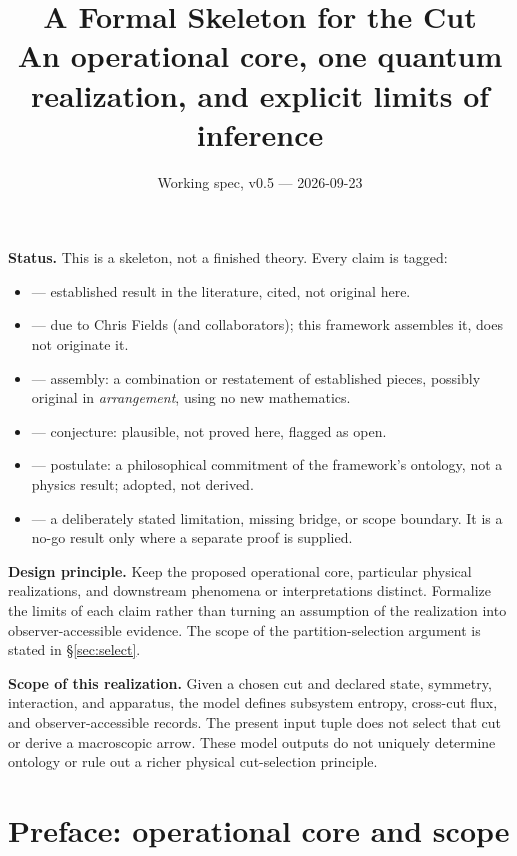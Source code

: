 \documentclass[11pt]{article}
\title{\textbf{A Formal Skeleton for the Cut}\\[4pt]
\large An operational core, one quantum realization, and explicit limits of inference}
\author{}
\date{Working spec, v0.5 --- 2026-09-23}
\newcommand{\est}{\textcolor{teal!70!black}{\textsf{\small[EST]}}}
\newcommand{\fields}{\textcolor{violet}{\textsf{\small[FIELDS]}}}
\newcommand{\asm}{\textcolor{blue!70!black}{\textsf{\small[ASM]}}}
\newcommand{\conj}{\textcolor{orange!80!black}{\textsf{\small[CONJ]}}}
\newcommand{\post}{\textcolor{purple!70!black}{\textsf{\small[POST]}}}
\newcommand{\gap}{\textcolor{red!75!black}{\textsf{\small[GAP]}}}
\def\est{[EST]}\def\fields{[FIELDS]}\def\asm{[ASM]}%
\def\conj{[CONJ]}\def\post{[POST]}\def\gap{[GAP]}%
\theoremstyle{definition}
\theoremstyle{remark}
\begin{document}
\maketitle

\begin{principlebox}
\noindent\textbf{Status.} This is a skeleton, not a finished theory. Every claim is tagged:
\begin{itemize}[leftmargin=1.4em, itemsep=1pt, topsep=3pt]
  \item \est{} --- established result in the literature, cited, not original here.
  \item \fields{} --- due to Chris Fields (and collaborators); this framework assembles it, does not originate it.
  \item \asm{} --- assembly: a combination or restatement of established pieces, possibly original in \emph{arrangement}, using no new mathematics.
  \item \conj{} --- conjecture: plausible, not proved here, flagged as open.
  \item \post{} --- postulate: a philosophical commitment of the framework's ontology, not a physics result; adopted, not derived.
  \item \gap{} --- a deliberately stated limitation, missing bridge, or scope boundary. It is a no-go result only where a separate proof is supplied.
\end{itemize}
\vspace{2pt}
\noindent\textbf{Design principle.} Keep the proposed operational core, particular physical realizations, and downstream phenomena or interpretations distinct. Formalize the limits of each claim rather than turning an assumption of the realization into observer-accessible evidence. The scope of the partition-selection argument is stated in \S\ref{sec:select}.

\vspace{2pt}
\noindent\textbf{Scope of this realization.} Given a chosen cut and declared state, symmetry, interaction, and apparatus, the model defines subsystem entropy, cross-cut flux, and observer-accessible records. The present input tuple does not select that cut or derive a macroscopic arrow. These model outputs do not uniquely determine ontology or rule out a richer physical cut-selection principle.
\end{principlebox}

\section*{Preface: operational core and scope}
\end{document}
